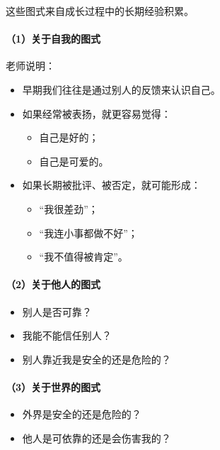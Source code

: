 \documentclass[
  chinese,
  9pt,
  a4paper,
]{ctexart}
\providecommand{\tightlist}{%
  \setlength{\itemsep}{0pt}\setlength{\parskip}{0pt}}
\begin{document}
这些图式来自成长过程中的长期经验积累。

\paragraph{（1）关于自我的图式}\label{ux5173ux4e8eux81eaux6211ux7684ux56feux5f0f}

老师说明：

\begin{itemize}
\item
  早期我们往往是通过别人的反馈来认识自己。
\item
  如果经常被表扬，就更容易觉得：

  \begin{itemize}
  \tightlist
  \item
    自己是好的；
  \item
    自己是可爱的。
  \end{itemize}
\item
  如果长期被批评、被否定，就可能形成：

  \begin{itemize}
  \tightlist
  \item
    ``我很差劲''；
  \item
    ``我连小事都做不好''；
  \item
    ``我不值得被肯定''。
  \end{itemize}
\end{itemize}

\paragraph{（2）关于他人的图式}\label{ux5173ux4e8eux4ed6ux4ebaux7684ux56feux5f0f}

\begin{itemize}
\tightlist
\item
  别人是否可靠？
\item
  我能不能信任别人？
\item
  别人靠近我是安全的还是危险的？
\end{itemize}

\paragraph{（3）关于世界的图式}\label{ux5173ux4e8eux4e16ux754cux7684ux56feux5f0f}

\begin{itemize}
\tightlist
\item
  外界是安全的还是危险的？
\item
  他人是可依靠的还是会伤害我的？
\end{itemize}
\end{document}
